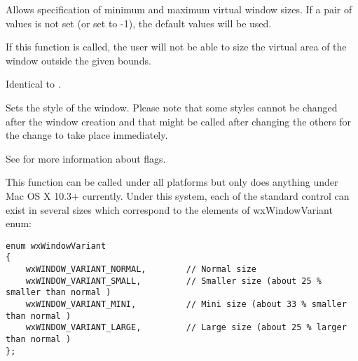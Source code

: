 

Allows specification of minimum and maximum virtual window sizes.
If a pair of values is not set (or set to -1), the default values
will be used.









If this function is called, the user will not be able to size the virtual area
of the window outside the given bounds.


\label{wxwindowsetwindowstyle}


Identical to .


\label{wxwindowsetwindowstyleflag}


Sets the style of the window. Please note that some styles cannot be changed
after the window creation and that  might
be called after changing the others for the change to take place immediately.

See  for more information about flags.




\label{wxwindowsetwindowvariant}


This function can be called under all platforms but only does anything under
Mac OS X 10.3+ currently. Under this system, each of the standard control can
exist in several sizes which correspond to the elements of wxWindowVariant
enum:
\begin{verbatim}
enum wxWindowVariant
{
    wxWINDOW_VARIANT_NORMAL,        // Normal size
    wxWINDOW_VARIANT_SMALL,         // Smaller size (about 25 % smaller than normal )
    wxWINDOW_VARIANT_MINI,          // Mini size (about 33 % smaller than normal )
    wxWINDOW_VARIANT_LARGE,         // Large size (about 25 % larger than normal )
};
\end{verbatim}

